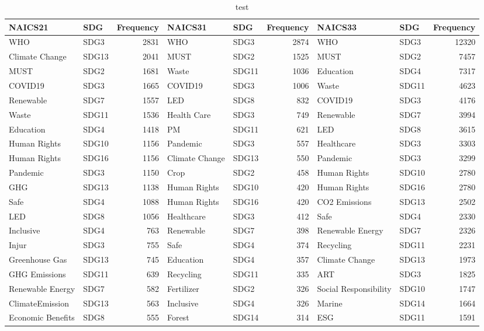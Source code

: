 \begin{table}

\caption{test}
\centering
\begin{tabular}[t]{llrllrllr}
\toprule
NAICS21 & SDG & Frequency & NAICS31 & SDG  & Frequency  & NAICS33 & SDG   & Frequency  \\
\midrule
WHO & SDG3 & 2831 & WHO & SDG3 & 2874 & WHO & SDG3 & 12320\\
Climate Change & SDG13 & 2041 & MUST & SDG2 & 1525 & MUST & SDG2 & 7457\\
MUST & SDG2 & 1681 & Waste & SDG11 & 1036 & Education & SDG4 & 7317\\
COVID19 & SDG3 & 1665 & COVID19 & SDG3 & 1006 & Waste & SDG11 & 4623\\
Renewable & SDG7 & 1557 & LED & SDG8 & 832 & COVID19 & SDG3 & 4176\\
\addlinespace
Waste & SDG11 & 1536 & Health Care & SDG3 & 749 & Renewable & SDG7 & 3994\\
Education & SDG4 & 1418 & PM & SDG11 & 621 & LED & SDG8 & 3615\\
Human Rights & SDG10 & 1156 & Pandemic & SDG3 & 557 & Healthcare & SDG3 & 3303\\
Human Rights & SDG16 & 1156 & Climate Change & SDG13 & 550 & Pandemic & SDG3 & 3299\\
Pandemic & SDG3 & 1150 & Crop & SDG2 & 458 & Human Rights & SDG10 & 2780\\
\addlinespace
GHG & SDG13 & 1138 & Human Rights & SDG10 & 420 & Human Rights & SDG16 & 2780\\
Safe & SDG4 & 1088 & Human Rights & SDG16 & 420 & CO2 Emissions & SDG13 & 2502\\
LED & SDG8 & 1056 & Healthcare & SDG3 & 412 & Safe & SDG4 & 2330\\
Inclusive & SDG4 & 763 & Renewable & SDG7 & 398 & Renewable Energy & SDG7 & 2326\\
Injur & SDG3 & 755 & Safe & SDG4 & 374 & Recycling & SDG11 & 2231\\
\addlinespace
Greenhouse Gas & SDG13 & 745 & Education & SDG4 & 357 & Climate Change & SDG13 & 1973\\
GHG Emissions & SDG11 & 639 & Recycling & SDG11 & 335 & ART & SDG3 & 1825\\
Renewable Energy & SDG7 & 582 & Fertilizer & SDG2 & 326 & Social Responsibility & SDG10 & 1747\\
ClimateEmission & SDG13 & 563 & Inclusive & SDG4 & 326 & Marine & SDG14 & 1664\\
Economic Benefits & SDG8 & 555 & Forest & SDG14 & 314 & ESG & SDG11 & 1591\\
\bottomrule
\end{tabular}
\end{table}
